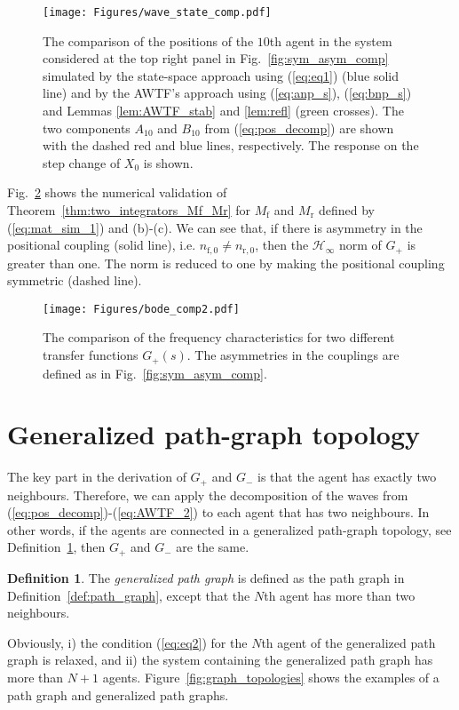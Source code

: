 \documentclass[10pt,twocolumn,twoside]{IEEEtran}
\theoremstyle{definition}
\newtheorem{defn}{Definition}
\newcommand{\revA}{Black}
\begin{document}
\begin{figure}[ht]
 \centering
  \texttt{[image: Figures/wave\_state\_comp.pdf]}
  \caption{
The comparison of the positions of the $10$th agent in the system considered at the top right panel in Fig.~\ref{fig:sym_asym_comp} simulated by the state-space approach using (\ref{eq:eq1}) (blue solid line) and by the AWTF's approach using (\ref{eq:anp_s}), (\ref{eq:bnp_s}) and Lemmas \ref{lem:AWTF_stab} and \ref{lem:refl} (green crosses). The two components $A_{10}$ and $B_{10}$ from (\ref{eq:pos_decomp}) are shown with the dashed red and blue lines, respectively. The response on the step change of $X_0$ is shown.}
  \label{fig:wave_state_comp}
\end{figure}

Fig.~\ref{fig:bode_comp} shows the numerical validation of Theorem~\ref{thm:two_integrators_Mf_Mr} for $M_{\text{f}}$ and $M_{\text{r}}$ defined by (\ref{eq:mat_sim_1}) and (b)-(c). We can see that, if there is asymmetry in the positional coupling (solid line), i.e. $n_{\text{f},0} \neq n_{\text{r},0}$, then the $\mathcal{H}_{\infty}$ norm of $G_+$ is greater than one. The norm is reduced to one by making the positional coupling symmetric (dashed line).
\begin{figure}[ht]
 \centering
  \texttt{[image: Figures/bode\_comp2.pdf]}
  \caption{
The comparison of the frequency characteristics for two different transfer functions $G_+(s)$. The asymmetries in the couplings are defined as in Fig.~\ref{fig:sym_asym_comp}.}
  \label{fig:bode_comp}
\end{figure}






{\color{\revA}
\section{Generalized path-graph topology}
}
The key part in the derivation of $G_{+}$ and $G_{-}$ is that the agent has exactly two neighbours. Therefore, we can apply the decomposition of the waves from (\ref{eq:pos_decomp})-(\ref{eq:AWTF_2}) to each agent that has two neighbours. In other words, if the agents are connected in {\color{\revA}a generalized path-graph topology, see Definition~\ref{def:generalized_path_graph}}, then $G_+$ and $G_-$ are the same.




{\color{\revA}
\begin{defn}\label{def:generalized_path_graph}
The \emph{generalized path graph} is defined as the path graph in Definition~\ref{def:path_graph}, except that the $N$th agent has more than two neighbours.
\end{defn}
Obviously, i) the condition (\ref{eq:eq2}) for the $N$th agent of the generalized path graph is relaxed, and ii) the system containing the generalized path graph has more than $N+1$ agents. Figure~\ref{fig:graph_topologies} shows the examples of a path graph and generalized path graphs.
}
\end{document}
